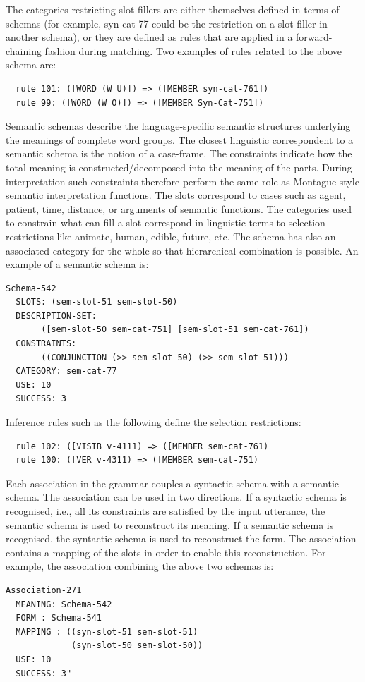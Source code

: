 The categories restricting slot-fillers are either themselves defined in terms of schemas
(for example, syn-cat-77 could be the restriction on a slot-filler in another schema), or they
are defined as rules that are applied in a forward-chaining fashion during matching. Two
examples of rules related to the above schema are:
\begin{verbatim}
  rule 101: ([WORD (W U)]) => ([MEMBER syn-cat-761])
  rule 99: ([WORD (W O)]) => ([MEMBER Syn-Cat-751])
\end{verbatim}
Semantic schemas describe the language-specific semantic structures underlying the
meanings of complete word groups. The closest linguistic correspondent to a semantic
schema is the notion of a case-frame. The constraints indicate how the total meaning
is constructed/decomposed into the meaning of the parts. During interpretation such
constraints therefore perform the same role as Montague style semantic interpretation
functions. The slots correspond to cases such as agent, patient, time, distance, or arguments
of semantic functions. The categories used to constrain what can fill a slot correspond
in linguistic terms to selection restrictions like animate, human, edible, future, etc. The
schema has also an associated category for the whole so that hierarchical combination is
possible. An example of a semantic schema is:
\begin{verbatim}
Schema-542
  SLOTS: (sem-slot-51 sem-slot-50)
  DESCRIPTION-SET: 
       ([sem-slot-50 sem-cat-751] [sem-slot-51 sem-cat-761])
  CONSTRAINTS: 
       ((CONJUNCTION (>> sem-slot-50) (>> sem-slot-51)))
  CATEGORY: sem-cat-77
  USE: 10
  SUCCESS: 3
\end{verbatim}
Inference rules such as the following define the selection restrictions:
\begin{verbatim}
  rule 102: ([VISIB v-4111) => ([MEMBER sem-cat-761)
  rule 100: ([VER v-4311) => ([MEMBER sem-cat-751)
\end{verbatim}
Each association in the grammar couples a syntactic schema with a semantic schema.
The association can be used in two directions. If a syntactic schema is recognised, i.e., all its 
constraints are satisfied by the input utterance, the semantic schema is
used to reconstruct its meaning. If a semantic schema is recognised, the syntactic schema
is used to reconstruct the form. The association contains a mapping of the slots in order to
enable this reconstruction. For example, the association combining the above two schemas is: 
\begin{verbatim}
Association-271
  MEANING: Schema-542
  FORM : Schema-541
  MAPPING : ((syn-slot-51 sem-slot-51)
             (syn-slot-50 sem-slot-50))
  USE: 10
  SUCCESS: 3"
\end{verbatim}\citep{Steels:1998}

